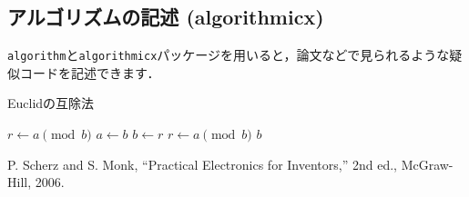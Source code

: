 \documentclass[
  a4paper,  %
  11pt,     %
]{ltjsarticle}%
\begin{document}
\subsection{アルゴリズムの記述 (algorithmicx)}
\verb|algorithm|と\verb|algorithmicx|パッケージを用いると，論文などで見られるような疑似コードを記述できます．

\begin{algorithm}[H]
  \caption{Euclidの互除法}
  \label{alg:euclid}
  \begin{algorithmic}[1] %
      \State $r \gets a \pmod b$
        \State $a \gets b$
        \State $b \gets r$
        \State $r \gets a \pmod b$
      \EndWhile
      \State \Return $b$
    \EndProcedure
  \end{algorithmic}
\end{algorithm}


\begin{thebibliography}{9}
P. Scherz and S. Monk, ``Practical Electronics for Inventors,'' 2nd ed., McGraw-Hill, 2006.
\end{thebibliography}
\end{document}
